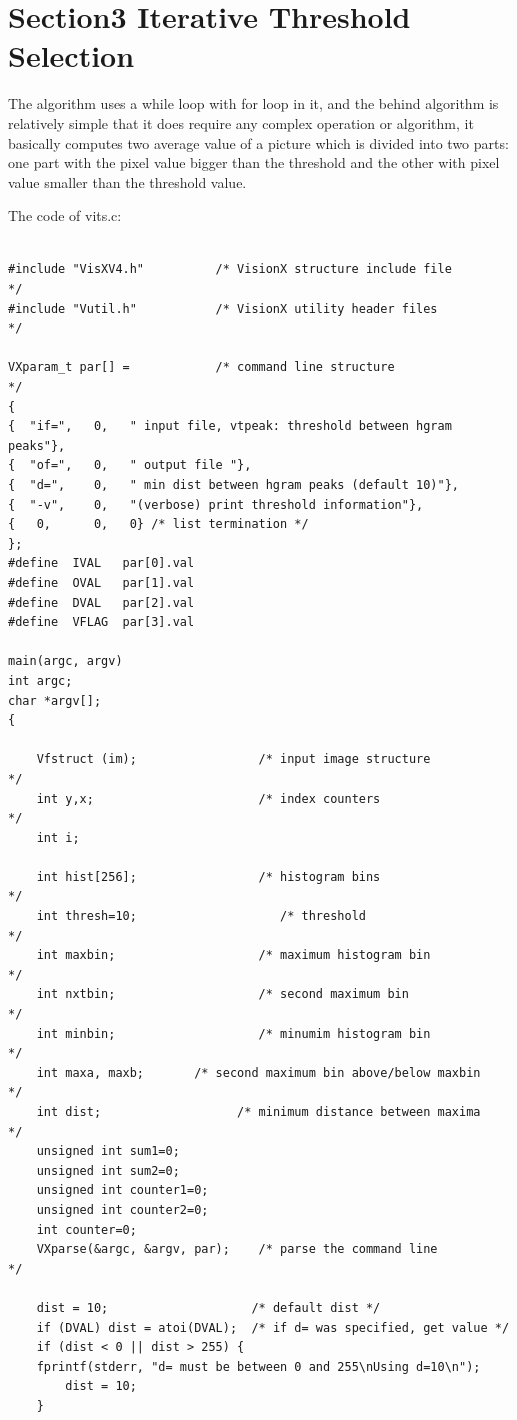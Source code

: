 \documentclass{article}
\begin{document}
\newpage
\section*{Section3 Iterative Threshold Selection}
The algorithm uses a while loop with for loop in it, and the behind algorithm is relatively simple that it does require any complex operation or algorithm, it basically computes two average value of a picture which is divided into two parts: one part with the pixel value bigger than the threshold and the other with pixel value smaller than the threshold value.
\par
\vspace{3mm}
The code of vits.c:
\lstset{language=C}
\begin{lstlisting}

#include "VisXV4.h"          /* VisionX structure include file       */
#include "Vutil.h"           /* VisionX utility header files         */

VXparam_t par[] =            /* command line structure               */
{
{  "if=",   0,   " input file, vtpeak: threshold between hgram peaks"},
{  "of=",   0,   " output file "},
{  "d=",    0,   " min dist between hgram peaks (default 10)"},
{  "-v",    0,   "(verbose) print threshold information"},
{   0,      0,   0} /* list termination */
};
#define  IVAL   par[0].val
#define  OVAL   par[1].val
#define  DVAL   par[2].val
#define  VFLAG  par[3].val

main(argc, argv)
int argc;
char *argv[];
{

    Vfstruct (im);                 /* input image structure          */
    int y,x;                       /* index counters                 */
    int i;

    int hist[256];                 /* histogram bins                 */
    int thresh=10;                    /* threshold                      */
    int maxbin;                    /* maximum histogram bin          */
    int nxtbin;                    /* second maximum bin             */
    int minbin;                    /* minumim histogram bin          */
    int maxa, maxb;       /* second maximum bin above/below maxbin   */
    int dist;                   /* minimum distance between maxima   */
    unsigned int sum1=0;
    unsigned int sum2=0;
    unsigned int counter1=0;
    unsigned int counter2=0;
    int counter=0;		
    VXparse(&argc, &argv, par);    /* parse the command line         */

    dist = 10;                    /* default dist */
    if (DVAL) dist = atoi(DVAL);  /* if d= was specified, get value */
    if (dist < 0 || dist > 255) {
	fprintf(stderr, "d= must be between 0 and 255\nUsing d=10\n");
        dist = 10;
    }


\end{lstlisting}
\end{document}
